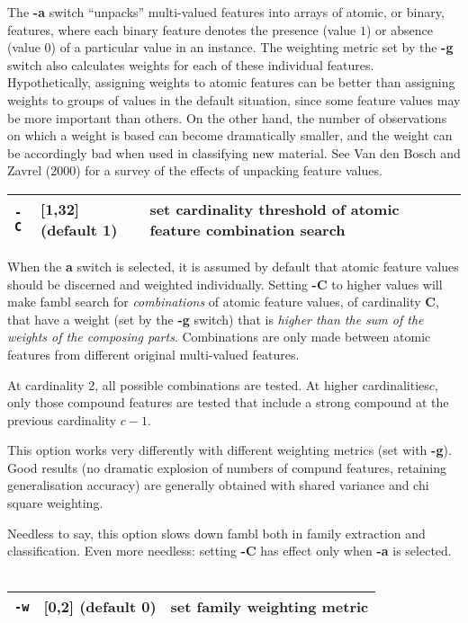 \documentclass[11pt]{article}
\begin{document}
The {\bf -a} switch ``unpacks'' multi-valued features into arrays of
atomic, or binary, features, where each binary feature denotes the
presence (value $1$) or absence (value $0$) of a particular value in
an instance. The weighting metric set by the {\bf -g} switch also
calculates weights for each of these individual
features. Hypothetically, assigning weights to atomic features can be
better than assigning weights to groups of values in the default
situation, since some feature values may be more important than
others. On the other hand, the number of observations on which a
weight is based can become dramatically smaller, and the weight can be
accordingly bad when used in classifying new material. See Van den
Bosch and Zavrel (2000) for a survey of the effects of unpacking
feature values.  \ \\

\begin{tabular}{|p{}|p{}|p{}|}
\hline
{\tt -C} & [1,32] (default 1) & set cardinality threshold of atomic feature combination search  \\
\hline
\end{tabular}

When the {\bf a} switch is selected, it is assumed by default that
atomic feature values should be discerned and weighted
individually. Setting {\bf -C} to higher values will make {\sc fambl}
search for {\em combinations} of atomic feature values, of cardinality
{\bf C}, that have a weight (set by the {\bf -g} switch) that is {\em
higher than the sum of the weights of the composing
parts}. Combinations are only made between atomic features from
different original multi-valued features. 

At cardinality 2, all possible combinations are tested. At higher
cardinalities$c$, only those compound features are tested that include
a strong compound at the previous cardinality $c-1$.

This option works very differently with different weighting metrics
(set with {\bf -g}). Good results (no dramatic explosion of numbers of
compund features, retaining generalisation accuracy) are generally
obtained with shared variance and chi square weighting.

Needless to say, this option slows down {\sc fambl} both in family
extraction and classification. Even more needless: setting {\bf -C}
has effect only when {\bf -a} is selected.
\ \\

\begin{tabular}{|p{}|p{}|p{}|}
\hline
{\tt -w} & [0,2] (default 0) & set family weighting metric \\
\hline
\end{tabular}
\end{document}
